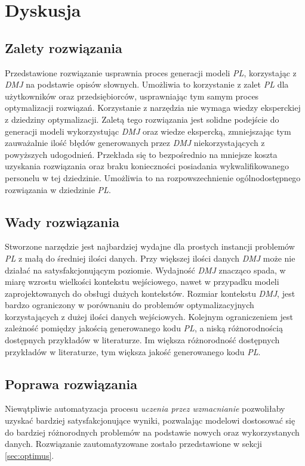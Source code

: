 
\chapter{Dyskusja}

\section{Zalety rozwiązania}

Przedstawione rozwiązanie usprawnia proces generacji modeli \textit{PL}, korzystając z \textit{DMJ} na podstawie opisów słownych. Umożliwia to korzystanie z zalet \textit{PL} dla użytkowników oraz przedsiębiorców, usprawniając tym samym proces optymalizacji rozwiązań. Korzystanie z narzędzia nie wymaga wiedzy eksperckiej z dziedziny optymalizacji. Zaletą tego rozwiązania jest solidne podejście do generacji modeli wykorzystując \textit{DMJ} oraz wiedze ekspercką, zmniejszając tym zauważalnie ilość błędów generowanych przez \textit{DMJ} niekorzystających z powyższych udogodnień. Przekłada się to bezpośrednio na mniejsze koszta uzyskania rozwiązania oraz braku konieczności posiadania wykwalifikowanego personelu w tej dziedzinie. Umożliwia to na rozpowszechnienie ogólnodostępnego rozwiązania w dziedzinie \textit{PL}. 

\section{Wady rozwiązania}
Stworzone narzędzie jest najbardziej wydajne dla prostych instancji problemów \textit{PL} z małą do średniej ilości danych. Przy większej ilości danych \textit{DMJ} może nie działać na satysfakcjonującym poziomie. Wydajność \textit{DMJ} znacząco spada, w miarę wzrostu wielkości kontekstu wejściowego, nawet w przypadku modeli zaprojektowanych do obsługi dużych kontekstów. Rozmiar kontekstu \textit{DMJ}, jest bardzo ograniczony w porównaniu do problemów optymalizacyjnych korzystających z dużej ilości danych wejściowych. \cite{10.1162/tacl_a_00638} Kolejnym ograniczeniem jest zależność pomiędzy jakością generowanego kodu \textit{PL}, a niską różnorodnością dostępnych przykładów w literaturze. Im większa różnorodność dostępnych przykładów w literaturze, tym większa jakość generowanego kodu \textit{PL}.

\section{Poprawa rozwiązania}
Niewątpliwie automatyzacja procesu \textit{uczenia przez wzmacnianie} pozwoliłaby uzyskać bardziej satysfakcjonujące wyniki, pozwalając modelowi dostosować się do bardziej różnorodnych problemów na podstawie nowych oraz wykorzystanych danych. Rozwiązanie zautomatyzowane zostało przedstawione w sekcji \ref{sec:optimus}. 

